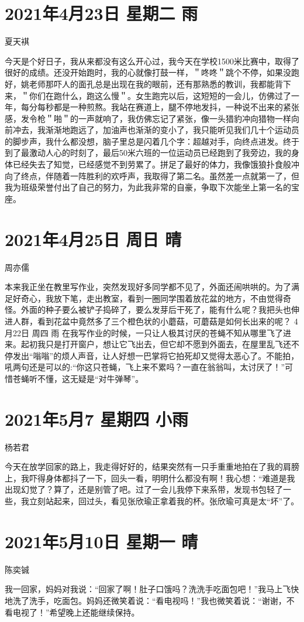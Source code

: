 \section{2021年4月23日 星期二 雨}

夏天褀

今天是个好日子，我从来都没有这么开心过，我今天在学校1500米比赛中，取得了很好的成绩。还没开始跑时，我的心就像打鼓一样，＂咚咚＂跳个不停，如果没跑好，姚老师那吓人的面孔总是出现在我的眼前，还有那熟悉的教训，我都能背下来，＂你们在跑什么，跑这么慢＂。女生跑完以后，这短短的一会儿，仿佛过了一年，每分每秒都是一种煎熬。我站在赛道上，腿不停地发抖，一种说不出来的紧张感，发令枪＂啪＂的一声就响了，我仿佛忘记了紧张，像一头猎豹冲向猎物一样向前冲去，我渐渐地跑远了，加油声也渐渐的变小了，我只能听见我们几十个运动员的脚步声，我什么都没想，脑子里总是闪着几个字：超越对手，向终点进发。终于到了最激动人心的时刻了，最后50米六班的一位运动员已经跑到了我旁边，我的身体已经失去了知觉，已经感觉不到劳累了。拼足了最好的体力，我像饿狼扑食般冲向了终点，伴随着一阵胜利的欢呼声，我取得了第二名。虽然差一点就第一了，但我为班级荣誉付出了自己的努力，为此我非常的自豪，争取下次能坐上第一名的宝座。

\section{2021年4月25日 周日 晴}

周亦儒

本来我正坐在教里写作业，突然发现好多同学都不见了，外面还闹哄哄的。为了满足好奇心，我放下笔，走出教室，看到一圈同学围着放花盆的地方，不由觉得奇怪。外面的种子要么被铲子捣碎了，要么发芽后干死了，能有什么呢？我把头也伸进人群，看到花盆中竟然多了三个橙色状的小蘑菇，可蘑菇是如何长出来的呢？
4月22日 周四 雨
在我写作业的时候，一只让人极其讨厌的苍蝇不知从哪里飞了进来。起初我只是打开窗户，想让它飞出去，但它却不愿到外面去，在屋里乱飞还不停发出``嗡嗡''的烦人声音，让人好想一巴掌将它拍死却又觉得太恶心了。不能拍，吼两句还是可以的:``你这只苍蝇，飞上来不累吗？一直在翁翁叫，太讨厌了！''可惜苍蝇听不懂，这无疑是``对牛弹琴''。

\section{2021年5月7 星期四 小雨}

杨若君

今天在放学回家的路上，我走得好好的，结果突然有一只手重重地拍在了我的肩膀上，我吓得身体都抖了一下，回头一看，明明什么都没有啊！我心想：``难道是我出现幻觉了？算了，还是别管了吧。过了一会儿我停下来系带，发现书包轻了一些，我立刻站起来，回过头，看见张欣瑜正拿着我的杯。张欣瑜可真是太``坏''了。

\section{2021年5月10日 星期一 晴}

陈奕铖

我一回家，妈妈对我说：``回家了啊！肚子口饿吗？洗洗手吃面包吧！''我马上飞快地洗了洗手，吃面包。妈妈还微笑着说：``看电视吗！''我也微笑着说：``谢谢，不看电视了！''希望晚上还能继续保持。
